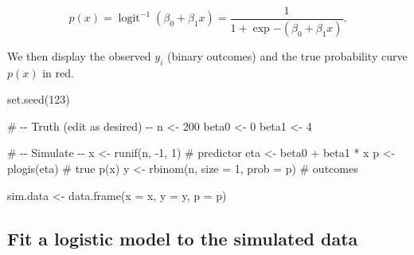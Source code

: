 \documentclass[
  letterpaper,
  DIV=11,
  numbers=noendperiod]{scrreprt}
\newenvironment{Shaded}{\begin{snugshade}}{\end{snugshade}}
\newcommand{\AttributeTok}[1]{\textcolor[rgb]{0.40,0.45,0.13}{#1}}
\newcommand{\CommentTok}[1]{\textcolor[rgb]{0.37,0.37,0.37}{#1}}
\newcommand{\DecValTok}[1]{\textcolor[rgb]{0.68,0.00,0.00}{#1}}
\newcommand{\FunctionTok}[1]{\textcolor[rgb]{0.28,0.35,0.67}{#1}}
\newcommand{\NormalTok}[1]{\textcolor[rgb]{0.00,0.23,0.31}{#1}}
\newcommand{\OtherTok}[1]{\textcolor[rgb]{0.00,0.23,0.31}{#1}}
\newcommand{\SpecialCharTok}[1]{\textcolor[rgb]{0.37,0.37,0.37}{#1}}
\begin{document}
\[
p(x)
=
\operatorname{logit}^{-1}(\beta_0+\beta_1 x)
=
\frac{1}{1+\exp{-(\beta_0+\beta_1 x)}}.
\]

We then display the observed \(y_i\) (binary outcomes) and the true
probability curve \(p(x)\) in red.

\begin{Shaded}
\begin{Highlighting}[]
\FunctionTok{set.seed}\NormalTok{(}\DecValTok{123}\NormalTok{)}

\CommentTok{\# {-}{-} Truth (edit as desired) {-}{-}}
\NormalTok{n     }\OtherTok{\textless{}{-}} \DecValTok{200}
\NormalTok{beta0 }\OtherTok{\textless{}{-}} \DecValTok{0}
\NormalTok{beta1 }\OtherTok{\textless{}{-}}  \DecValTok{4}

\CommentTok{\# {-}{-} Simulate {-}{-}}
\NormalTok{x   }\OtherTok{\textless{}{-}} \FunctionTok{runif}\NormalTok{(n, }\SpecialCharTok{{-}}\DecValTok{1}\NormalTok{, }\DecValTok{1}\NormalTok{)             }\CommentTok{\# predictor}
\NormalTok{eta }\OtherTok{\textless{}{-}}\NormalTok{ beta0 }\SpecialCharTok{+}\NormalTok{ beta1 }\SpecialCharTok{*}\NormalTok{ x}
\NormalTok{p   }\OtherTok{\textless{}{-}} \FunctionTok{plogis}\NormalTok{(eta)                 }\CommentTok{\# true p(x)}
\NormalTok{y   }\OtherTok{\textless{}{-}} \FunctionTok{rbinom}\NormalTok{(n, }\AttributeTok{size =} \DecValTok{1}\NormalTok{, }\AttributeTok{prob =}\NormalTok{ p) }\CommentTok{\# outcomes}

\NormalTok{sim.data }\OtherTok{\textless{}{-}} \FunctionTok{data.frame}\NormalTok{(}\AttributeTok{x =}\NormalTok{ x, }\AttributeTok{y =}\NormalTok{ y, }\AttributeTok{p =}\NormalTok{ p)}
\end{Highlighting}
\end{Shaded}

\subsection{Fit a logistic model to the simulated
data}\label{fit-a-logistic-model-to-the-simulated-data}
\end{document}
